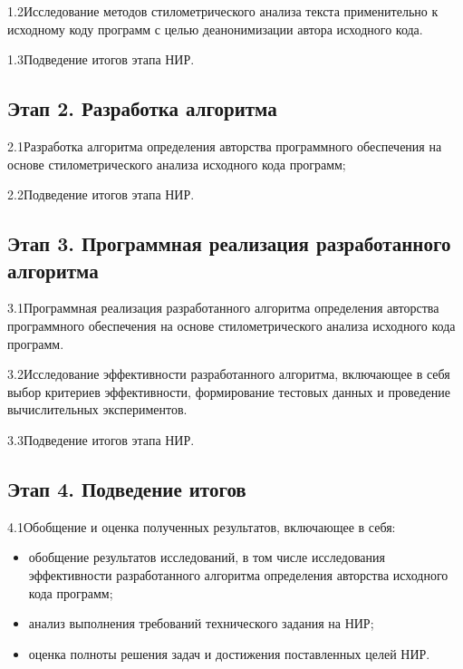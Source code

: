 1.2\hspace{5mm}Исследование методов стилометрического анализа текста применительно к исходному коду программ с целью деанонимизации автора исходного кода.

1.3\hspace{5mm}Подведение итогов этапа НИР.

\subsection*{Этап 2. Разработка алгоритма}
2.1\hspace{5mm}Разработка алгоритма определения авторства программного обеспечения на основе стилометрического анализа исходного кода программ;

2.2\hspace{5mm}Подведение итогов этапа НИР.

\subsection*{Этап 3. Программная реализация разработанного алгоритма}
3.1\hspace{5mm}Программная реализация разработанного алгоритма определения авторства программного обеспечения на основе стилометрического анализа исходного кода программ.

3.2\hspace{5mm}Исследование эффективности разработанного алгоритма, включающее в себя выбор критериев эффективности, формирование тестовых данных и проведение вычислительных экспериментов.

3.3\hspace{5mm}Подведение итогов этапа НИР.

\subsection*{Этап 4. Подведение итогов}
4.1\hspace{5mm}Обобщение и оценка полученных результатов, включающее в себя:
\begin{itemize}
  \item обобщение результатов исследований, в том числе исследования эффективности разработанного алгоритма определения авторства исходного кода программ;
  \item анализ выполнения требований технического задания на НИР;
  \item оценка полноты решения задач и достижения поставленных целей НИР.
\end{itemize}

